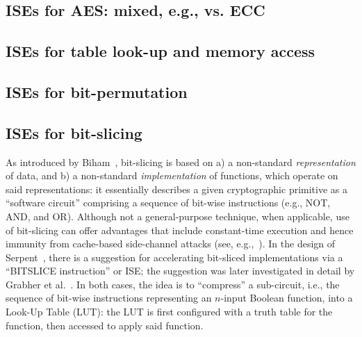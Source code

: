 \subsection*{ISEs for AES: mixed, e.g., vs. ECC}
\cite{SCARV:TilGro:05,SCARV:TilGro:07:b}

\subsection*{ISEs for table look-up and memory access}
\cite{SCARV:FisLee:01,SCARV:FisLee:05:a,SCARV:FisLee:05:b,SCARV:HilYinLee:08}

\subsection*{ISEs for bit-permutation}
\cite{SCARV:ShiLee:00,SCARV:YanLee:00,SCARV:McGLee:01,SCARV:LeeShiYan:01,SCARV:ShiLee:02,SCARV:ShiYanLee:03,SCARV:LSYRR:04,MASCAB:LeeYanShi:05,SCARV:HilYinLee:08,SCARV:HilLee:08,SCARV:ShiYanLee:08}
\subsection*{ISEs for bit-slicing}
As introduced by Biham~\cite{SCARV:Biham:97}, bit-slicing is based on
a) a non-standard {\em representation} of data,
   and
b) a non-standard {\em implementation} of functions, which operate on
   said representations:
it essentially describes a given cryptographic primitive as a  ``software 
circuit'' comprising a sequence of bit-wise instructions (e.g., NOT, AND, 
and OR).  Although not a general-purpose technique, when applicable, use
of bit-slicing can offer advantages that include constant-time execution 
and hence immunity from cache-based side-channel attacks
(see, e.g.,~\cite{SCARV:KasSch:09}).
In the design of Serpent~\cite[Page 232]{SCARV:BihAndKnu:98}, there is a
suggestion for accelerating bit-sliced implementations via a ``BITSLICE 
instruction'' or ISE; the suggestion was later investigated in detail by 
Grabher et al.~\cite{SCARV:GraGroPag:08}.  In both cases, the idea is to 
``compress'' a sub-circuit, i.e., the sequence of bit-wise instructions 
representing an $n$-input Boolean function, into a Look-Up Table (LUT): 
the LUT is first configured with a truth table for the function, then 
accessed to apply said function.  

